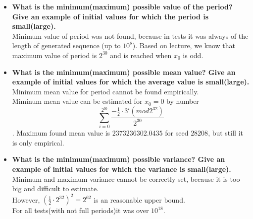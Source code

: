 \documentclass[a4paper,10pt]{article}
\begin{document}
\begin{itemize}
 \item \textbf{What is the minimum(maximum) possible value of the period? Give an example of initial values for which the period is small(large).} \\ 
Minimum value of period was not found, because in tests it was always of the length of generated sequence (up to $10^8$).  Based on lecture, we know that maximum value of period is $2^{30}$ and is reached when $x_0$ is odd.

 \item \textbf{What is the minimum(maximum) possible mean value? Give an example of initial values for which the average value is small(large).} \\
Minimum mean value for period cannot be found empirically. \\
Miminum mean value can be estimated for $x_0 = 0$ by number $$\sum_{i=0}^{2^{30}}\frac{-\frac{1}{2} \cdot 3^{i}(mod 2^{32})}{2^{30}}$$.
Maximum found mean value is $2373236302.0435$ for seed $28208$, but still it is only empirical.

 \item \textbf{What is the minimum(maximum) possible variance? Give an example of initial values for which the variance is small(large).} \\
Minimum and maximum variance cannot be correctly set, because it is too big and difficult to estimate. \\
However, $(\frac{1}{2} \cdot 2^{32})^2 = 2^{62}$ is an reasonable upper bound.
\\ For all tests(with not full periods)it was over $10^{18}$.


\end{itemize}
\end{document}
